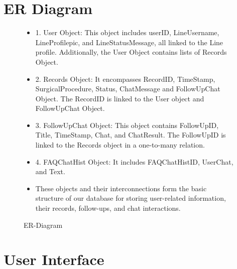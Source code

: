 \documentclass[12pt,oneside,openright,a4paper]{cpe-english-project}
\begin{document}
  \section{ER Diagram}
    \begin{figure}[!h]
      \centering
      \caption{ER-Diagram}\label{fig:ER}
      \begin{itemize}
        \item[] 1. User Object: This object includes userID, LineUsername, LineProfilepic, and LineStatusMessage, all linked to the Line profile. Additionally, the User Object contains lists of Records Object.
        \item[] 2. Records Object: It encompasses RecordID, TimeStamp, SurgicalProcedure, Status, ChatMessage and FollowUpChat Object. The RecordID is linked to the User object and FollowUpChat Object.
        \item[] 3. FollowUpChat Object: This object contains FollowUpID, Title, TimeStamp, Chat, and ChatResult. The FollowUpID is linked to the Records object in a one-to-many relation.
        \item[] 4. FAQChatHist Object: It includes FAQChatHistID, UserChat, and Text.
        \item[] These objects and their interconnections form the basic structure of our database for storing user-related information, their records, follow-ups, and chat interactions.
      \end{itemize}
    \end{figure}
  \section{User Interface}
\end{document}
